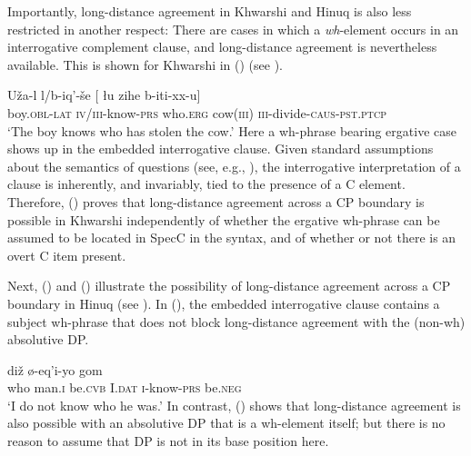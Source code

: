 \documentclass[output=paper
,modfonts
,nonflat]{langsci/langscibook}
\begin{document}
	Importantly, long-distance agreement in Khwarshi and Hinuq is also less
	restricted in another respect:
	There are cases in which a {\em wh}-element occurs in
	an interrogative  complement clause, and long-distance agreement is nevertheless
	available. This is shown for Khwarshi in (\Next) (see \citealt{Khalilova09}). 
	
	\ea\label{ex:mueller:18}
	\gll U\v{z}a-l l/b-iq'-\v{s}e [ \l \label{cp1}u\sub{\rm [foc]} zihe b-iti-xx-u] \\
	boy.{\scshape obl-lat} {\scshape iv/iii}-know-{\scshape prs} {} who.{\scshape erg} cow({\scshape iii}) {\scshape iii}-divide-{\scshape caus-pst.ptcp} \\
	\glt `The boy knows who has stolen the cow.'
	\z
	Here a wh-phrase bearing ergative case shows up in the embedded
	interrogative clause. Given standard assumptions about the
	semantics of questions (see, e.g., \citealt{Stechow:96:aga}),
	the interrogative interpretation of a clause is inherently, and
	invariably, tied to the presence of a C element. Therefore, (\Last)
	proves that long-distance agreement across a CP boundary is possible
	in Khwarshi independently of whether the ergative wh-phrase can be
	assumed to be located in SpecC in the syntax, and of whether or not
	there is an overt C item present. 
	
	Next, (\Next) and (\NNext) illustrate the possibility of long-distance
	agreement across a CP boundary in Hinuq (see \citealt{Forker:11}). In
	(\Next), the embedded interrogative clause contains a subject
	wh-phrase that does not block long-distance agreement with the
	(non-wh) absolutive DP. 
	
	\ea\label{ex:mueller:19} 
	\gll{} di\v{z} \o -eq'i-yo gom \\
	{} who man.{\scshape i} be.{\scshape cvb} I.{\scshape dat} {\scshape i}-know-{\scshape prs}  be.{\scshape neg} \\ 
	\glt `I do not know who he was.'
	\z
	In contrast, (\Next) shows that long-distance agreement is also possible with
	an absolutive DP that is a wh-element itself; but there is no reason
	to assume that DP is not in its base position here. 
	
\end{document}
